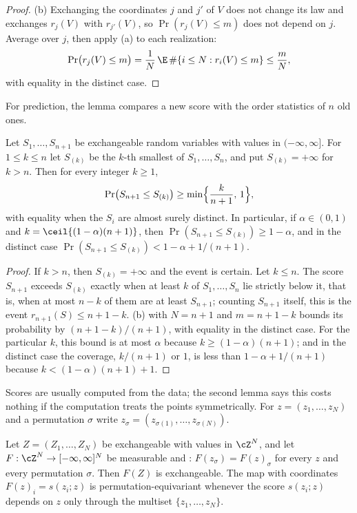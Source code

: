 \begin{refsection}
\begin{proof}
(b) Exchanging the coordinates $j$ and $j'$ of $V$ does not change its law and exchanges $r_j(V)$ with $r_{j'}(V)$, so $\Pr(r_j(V)\le m)$ does not depend on $j$. Average over $j$, then apply (a) to each realization:
\[
\Pr\bigl(r_j(V)\le m\bigr)=\frac1N\,\E\,\#\{i\le N : r_i(V)\le m\}\le\frac mN,
\]
with equality in the distinct case.
\end{proof}

For prediction, the lemma compares a new score with the order statistics of $n$ old ones.

\begin{corollary}\label{cor:conformal:quantile}
Let $S_1,\dots,S_{n+1}$ be exchangeable random variables with values in $(-\infty,\infty]$. For $1\le k\le n$ let $S_{(k)}$ be the $k$-th smallest of $S_1,\dots,S_n$, and put $S_{(k)}=+\infty$ for $k>n$. Then for every integer $k\ge1$,
\[
\Pr\bigl(S_{n+1}\le S_{(k)}\bigr)\ge\min\Bigl\{\frac{k}{n+1},\,1\Bigr\},
\]
with equality when the $S_i$ are almost surely distinct. In particular, if $\alpha\in(0,1)$ and $k=\ceil{(1-\alpha)(n+1)}$, then $\Pr(S_{n+1}\le S_{(k)})\ge1-\alpha$, and in the distinct case $\Pr(S_{n+1}\le S_{(k)})<1-\alpha+1/(n+1)$.
\end{corollary}

\begin{proof}
If $k>n$, then $S_{(k)}=+\infty$ and the event is certain. Let $k\le n$. The score $S_{n+1}$ exceeds $S_{(k)}$ exactly when at least $k$ of $S_1,\dots,S_n$ lie strictly below it, that is, when at most $n-k$ of them are at least $S_{n+1}$; counting $S_{n+1}$ itself, this is the event $r_{n+1}(S)\le n+1-k$. (b) with $N=n+1$ and $m=n+1-k$ bounds its probability by $(n+1-k)/(n+1)$, with equality in the distinct case. For the particular $k$, this bound is at most $\alpha$ because $k\ge(1-\alpha)(n+1)$; and in the distinct case the coverage, $k/(n+1)$ or $1$, is less than $1-\alpha+1/(n+1)$ because $k<(1-\alpha)(n+1)+1$.
\end{proof}

Scores are usually computed from the data; the second lemma says this costs nothing if the computation treats the points symmetrically. For $z=(z_1,\dots,z_N)$ and a permutation $\sigma$ write $z_\sigma=(z_{\sigma(1)},\dots,z_{\sigma(N)})$.

\begin{lemma}[Equivariance]\label{lem:conformal:equivariance}
Let $Z=(Z_1,\dots,Z_N)$ be exchangeable with values in $\cZ^N$, and let $F:\cZ^N\to[-\infty,\infty]^N$ be measurable and : $F(z_\sigma)=F(z)_\sigma$ for every $z$ and every permutation $\sigma$. Then $F(Z)$ is exchangeable. The map with coordinates $F(z)_i=s(z_i;z)$ is permutation-equivariant whenever the score $s(z_i;z)$ depends on $z$ only through the multiset $\{z_1,\dots,z_N\}$.
\end{lemma}


\end{refsection}
